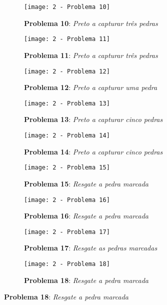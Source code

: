 \pagebreak

\begin{figure}[ht!]
    \centering
    \captionsetup{justification=raggedright,singlelinecheck=false}
    \begin{subfigure}[t]{.3\textwidth}
        \texttt{[image: 2 - Problema 10]}
        \caption*{\textbf{Problema 10}: \emph{Preto a capturar três pedras}}
    \end{subfigure}
    \hfill
    \begin{subfigure}[t]{.3\textwidth}
        \texttt{[image: 2 - Problema 11]}
        \caption*{\textbf{Problema 11}: \emph{Preto a capturar três pedras}}
    \end{subfigure}
    \hfill
    \begin{subfigure}[t]{.3\textwidth}
        \texttt{[image: 2 - Problema 12]}
        \caption*{\textbf{Problema 12}: \emph{Preto a capturar uma pedra}}
    \end{subfigure}
    \par\bigskip
    \begin{subfigure}[t]{.3\textwidth}
        \texttt{[image: 2 - Problema 13]}
        \caption*{\textbf{Problema 13}: \emph{Preto a capturar cinco pedras}}
    \end{subfigure}
    \hfill
    \begin{subfigure}[t]{.3\textwidth}
        \texttt{[image: 2 - Problema 14]}
        \caption*{\textbf{Problema 14}: \emph{Preto a capturar cinco pedras}}
    \end{subfigure}
    \hfill
    \begin{subfigure}[t]{.3\textwidth}
        \texttt{[image: 2 - Problema 15]}
        \caption*{\textbf{Problema 15}: \emph{Resgate a pedra marcada}}
    \end{subfigure}
    \par\bigskip
    \begin{subfigure}[t]{.3\textwidth}
        \texttt{[image: 2 - Problema 16]}
        \caption*{\textbf{Problema 16}: \emph{Resgate a pedra marcada}}
    \end{subfigure}
    \hfill
    \begin{subfigure}[t]{.3\textwidth}
        \texttt{[image: 2 - Problema 17]}
        \caption*{\textbf{Problema 17}: \emph{Resgate as pedras marcadas}}
    \end{subfigure}
    \hfill
    \begin{subfigure}[t]{.3\textwidth}
        \texttt{[image: 2 - Problema 18]}
        \caption*{\textbf{Problema 18}: \emph{Resgate a pedra marcada}}
    \end{subfigure}
\end{figure}

